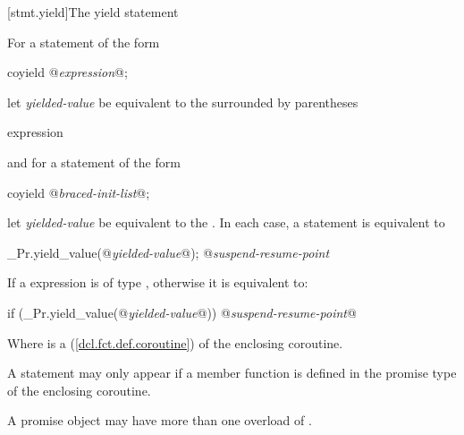 %

[stmt.yield]{The yield statement}%

\pnum
For a  statement of the form

\begin{codeblock}
  coyield @\textit{expression}@;
\end{codeblock}

let \textit{yielded-value} be equivalent to the  surrounded
by parentheses

\begin{ncbnf}
  \terminal{(} expression \terminal{)}
\end{ncbnf}

and for a  statement of the form

\begin{codeblock}
  coyield @\textit{braced-init-list}@;
\end{codeblock}

let \textit{yielded-value} be equivalent to the . In each case,
a  statement is equivalent to

\begin{codeblock}
  _Pr.yield_value(@\textit{yielded-value}@);
  @\textit{suspend-resume-point}
\end{codeblock}

If a  expression is of type , otherwise it is equivalent to:

\begin{codeblock}
  if (_Pr.yield_value(@\textit{yielded-value}@)) {
    @\textit{suspend-resume-point}@
  }
\end{codeblock}

Where  is a  (\ref{dcl.fct.def.coroutine}) of the enclosing coroutine.

\pnum
A  statement may only appear if a  member
function is defined in the promise type of the enclosing coroutine.

\pnum
A promise object may have more than one overload of .

